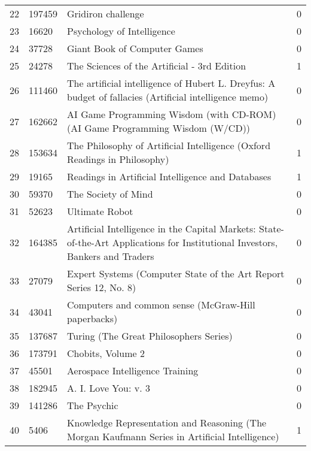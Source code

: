 \begin{tabular}{llll}
22 & 197459 & Gridiron challenge & 0 \\
23 & 16620 & Psychology of Intelligence & 0 \\
24 & 37728 & Giant Book of Computer Games & 0 \\
25 & 24278 & The Sciences of the Artificial - 3rd Edition & 1 \\
26 & 111460 & The artificial intelligence of Hubert L. Dreyfus: A budget of fallacies (Artificial intelligence memo) & 0 \\
27 & 162662 & AI Game Programming Wisdom (with CD-ROM) (AI Game Programming Wisdom (W/CD)) & 0 \\
28 & 153634 & The Philosophy of Artificial Intelligence (Oxford Readings in Philosophy) & 1 \\
29 & 19165 & Readings in Artificial Intelligence and Databases & 1 \\
30 & 59370 & The Society of Mind & 0 \\
31 & 52623 & Ultimate Robot & 0 \\
32 & 164385 & Artificial Intelligence in the Capital Markets: State-of-the-Art Applications for Institutional Investors, Bankers and Traders & 0 \\
33 & 27079 & Expert Systems (Computer State of the Art Report Series 12, No. 8) & 0 \\
34 & 43041 & Computers and common sense (McGraw-Hill paperbacks) & 0 \\
35 & 137687 & Turing (The Great Philosophers Series) & 0 \\
36 & 173791 & Chobits, Volume 2 & 0 \\
37 & 45501 & Aerospace Intelligence Training & 0 \\
38 & 182945 & A. I. Love You: v. 3 & 0 \\
39 & 141286 & The Psychic & 0 \\
40 & 5406 & Knowledge Representation and Reasoning (The Morgan Kaufmann Series in Artificial Intelligence) & 1 \\
\bottomrule
\end{tabular}

